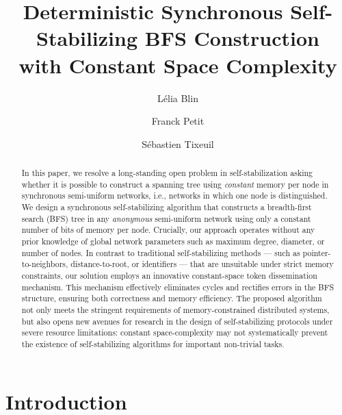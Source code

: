 \documentclass[a4paper, 12pt]{article}
\title{Deterministic Synchronous Self-Stabilizing BFS Construction\\
       with Constant Space Complexity}
\author{L\'elia Blin \and Franck Petit \and S\'ebastien Tixeuil}
\date{}
\begin{document}
\maketitle
\begin{abstract}

In this paper, we resolve a long-standing open problem in self-stabilization asking whether it is possible to construct a spanning tree using \emph{constant} memory per node in synchronous semi-uniform networks, i.e., networks in which one node is distinguished.
We design a synchronous self-stabilizing  algorithm that constructs a breadth-first search (BFS) tree in any \emph{anonymous} semi-uniform network using only a constant number of bits of memory per node. 
Crucially, our approach operates without any prior knowledge of global network parameters such as maximum degree, diameter, or number of nodes. In contrast to traditional self-stabilizing methods — such as pointer-to-neighbors, distance-to-root, or identifiers — that are unsuitable under strict memory constraints, our solution employs an innovative constant-space token dissemination mechanism. This mechanism effectively eliminates cycles and rectifies errors in the BFS structure, ensuring both correctness and memory efficiency. The proposed algorithm not only meets the stringent requirements of memory-constrained distributed systems, but also opens new avenues for research in the design of self-stabilizing protocols under severe resource limitations: constant space-complexity may not systematically prevent the existence of self-stabilizing algorithms for important non-trivial tasks.
\end{abstract}

\section{Introduction}
\end{document}
